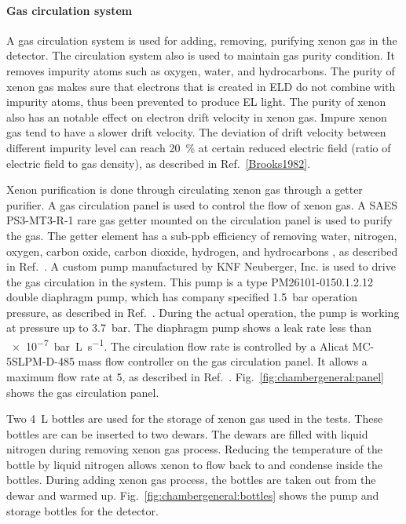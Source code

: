 \paragraph{Gas circulation system}
A gas circulation system is used for adding, removing, purifying xenon gas in the detector. The circulation system %
also is used to maintain gas purity condition. It removes impurity atoms such as oxygen, water, and hydrocarbons. The purity of xenon gas makes sure that electrons that is created in ELD do not combine with impurity atoms, thus been prevented to produce EL light. The purity of xenon also has an notable effect on electron drift velocity in xenon gas. Impure xenon gas tend to have a slower drift velocity. The deviation of drift velocity between different impurity level can reach \SI{20}{\percent} at certain reduced electric field (ratio of electric field to gas density), as described in Ref.~\ref{Brooks1982}. 

Xenon purification is done through circulating xenon gas through a getter purifier. A gas circulation panel is used to control the flow of xenon gas. A SAES PS3-MT3-R-1 rare gas getter mounted on the circulation panel is used to purify the gas. The getter element has a sub-ppb efficiency of removing water, nitrogen, oxygen, carbon oxide, carbon dioxide, hydrogen, and hydrocarbons%
, as described in Ref.~\cite{SAESgetters2002}.  A custom pump manufactured by KNF Neuberger, Inc. is used to drive the gas circulation in the system. This pump is a type PM26101-0150.1.2.12 double diaphragm pump, which has company specified \SI{1.5}{\bar} operation pressure, as described in Ref.~\cite{KNFNeuberger}. During the actual operation, the pump is working at pressure up to \SI{3.7}{\bar}. The diaphragm pump shows a leak rate less than \SI{e-7}{\bar\liter\per\s}. The circulation flow rate is controlled by a Alicat MC-5SLPM-D-485  mass flow controller on the gas circulation panel. It allows a maximum flow rate at \SI{5}{\slpm}, as described in Ref.~\cite{AlicatScientific}. 
Fig.~\ref{fig:chambergeneral:panel} shows the gas circulation panel. 

Two \SI{4}{\liter} bottles are used for the storage of xenon gas used in the tests. These bottles are can be inserted to two dewars. The dewars are filled with liquid nitrogen during removing xenon gas process. Reducing the temperature of the bottle by liquid nitrogen allows xenon to flow back to and condense inside the bottles. During adding xenon gas process, the bottles are taken out from the dewar and warmed up. Fig.~\ref{fig:chambergeneral:bottles} shows the pump and storage bottles for the detector. 

